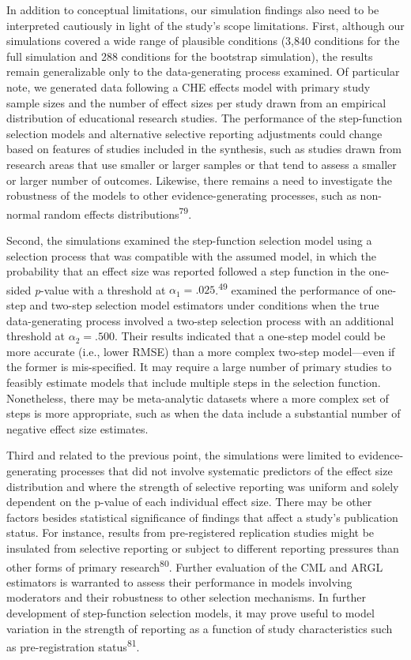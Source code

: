\documentclass[
  american,
  man, donotrepeattitle,floatsintext]{apa7}
\begin{document}
In addition to conceptual limitations, our simulation findings also need to be interpreted cautiously in light of the study's scope limitations.
First, although our simulations covered a wide range of plausible conditions (3,840 conditions for the full simulation and 288 conditions for the bootstrap simulation), the results remain generalizable only to the data-generating process examined.
Of particular note, we generated data following a CHE effects model with primary study sample sizes and the number of effect sizes per study drawn from an empirical distribution of educational research studies.
The performance of the step-function selection models and alternative selective reporting adjustments could change based on features of studies included in the synthesis, such as studies drawn from research areas that use smaller or larger samples or that tend to assess a smaller or larger number of outcomes.
Likewise, there remains a need to investigate the robustness of the models to other evidence-generating processes, such as non-normal random effects distributions\textsuperscript{79}.

Second, the simulations examined the step-function selection model using a selection process that was compatible with the assumed model, in which the probability that an effect size was reported followed a step function in the one-sided \emph{p}-value with a threshold at \(\alpha_1 = .025\).\textsuperscript{49} examined the performance of one-step and two-step selection model estimators under conditions when the true data-generating process involved a two-step selection process with an additional threshold at \(\alpha_2 = .500\).
Their results indicated that a one-step model could be more accurate (i.e., lower RMSE) than a more complex two-step model---even if the former is mis-specified.
It may require a large number of primary studies to feasibly estimate models that include multiple steps in the selection function.
Nonetheless, there may be meta-analytic datasets where a more complex set of steps is more appropriate, such as when the data include a substantial number of negative effect size estimates.

Third and related to the previous point, the simulations were limited to evidence-generating processes that did not involve systematic predictors of the effect size distribution and where the strength of selective reporting was uniform and solely dependent on the p-value of each individual effect size.
There may be other factors besides statistical significance of findings that affect a study's publication status.
For instance, results from pre-registered replication studies might be insulated from selective reporting or subject to different reporting pressures than other forms of primary research\textsuperscript{80}.
Further evaluation of the CML and ARGL estimators is warranted to assess their performance in models involving moderators and their robustness to other selection mechanisms.
In further development of step-function selection models, it may prove useful to model variation in the strength of reporting as a function of study characteristics such as pre-registration status\textsuperscript{81}.
\end{document}
